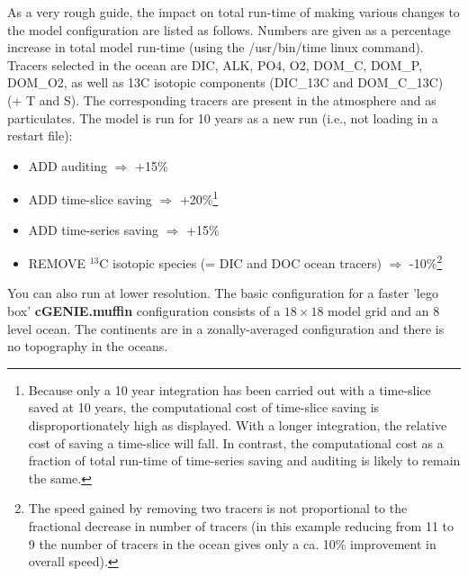 \documentclass[11pt,fleqn]{book} %
\begin{document}
\vspace{2mm}
As a very rough guide, the impact on total run-time of making various changes to the model configuration are listed as follows. Numbers are given as a percentage increase in total model run-time (using the /usr/bin/time linux command). Tracers selected in the ocean are DIC, ALK, PO4, O2, DOM\_C, DOM\_P, DOM\_O2, as well as 13C isotopic components (DIC\_13C and DOM\_C\_13C) (+ T and S). The corresponding tracers are present in the atmosphere and as particulates. The model is run for 10 years as a new run (i.e., not loading in a restart file):

\begin{itemize}[noitemsep]
\setlength{\itemindent}{.2in}

\item   ADD auditing \begin{math}\Rightarrow\end{math} +15\%
\item   ADD time-slice saving   \begin{math}\Rightarrow\end{math} +20\%\footnote{Because only a 10 year integration has been carried out with a time-slice saved at 10 years, the computational cost of time-slice saving is disproportionately high as displayed. With a longer integration, the relative cost of saving a time-slice will fall. In contrast, the computational cost as a fraction of total run-time of time-series saving and auditing is likely to remain the same.}
\item   ADD time-series saving  \begin{math}\Rightarrow\end{math} +15\%
\item   REMOVE \begin{math}^{13}\end{math}C isotopic species (= DIC and DOC ocean tracers) \begin{math}\Rightarrow\end{math} -10\%\footnote{The speed gained by removing two tracers is not proportional to the fractional decrease in number of tracers (in this example reducing from 11 to 9 the number of tracers in the ocean gives only a ca. 10\% improvement in overall speed).}

\end{itemize}

\vspace{2mm}
You can also run at lower resolution. The basic configuration for a faster 'lego box' \textbf{cGENIE.muffin} configuration consists of a \(18\times 18\) model grid and an \(8\) level ocean. The continents are in a zonally-averaged configuration and there is no topography in the oceans.
\end{document}
